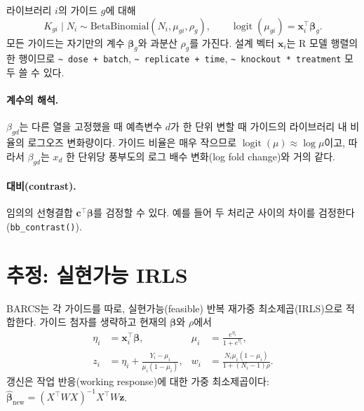 \documentclass[11pt]{article}
\newcommand{\logit}{\operatorname{logit}}
\begin{document}
라이브러리 $i$의 가이드 $g$에 대해
\begin{equation}
K_{gi}\mid N_i\sim\mathrm{BetaBinomial}(N_i,\mu_{gi},\rho_g),\qquad
\logit(\mu_{gi})=\mathbf{x}_i^\top\boldsymbol\beta_g .
\label{eq:model}
\end{equation}
모든 가이드는 자기만의 계수 $\boldsymbol\beta_g$와 과분산 $\rho_g$를 가진다.
설계 벡터 $\mathbf{x}_i$는 R 모델 행렬의 한 행이므로
\texttt{\textasciitilde{} dose + batch},
\texttt{\textasciitilde{} replicate + time},
\texttt{\textasciitilde{} knockout * treatment} 모두 쓸 수 있다.

\paragraph{계수의 해석.}
$\beta_{gd}$는 다른 열을 고정했을 때 예측변수 $d$가 한 단위 변할 때 가이드의
라이브러리 내 비율의 로그오즈 변화량이다. 가이드 비율은 매우 작으므로
$\logit(\mu)\approx\log\mu$이고, 따라서 $\beta_{gd}$는 $x_d$ 한 단위당
풍부도의 로그 배수 변화(log fold change)와 거의 같다.

\paragraph{대비(contrast).}
임의의 선형결합 $\mathbf{c}^\top\boldsymbol\beta$를 검정할 수 있다. 예를 들어
두 처리군 사이의 차이를 검정한다(\texttt{bb\_contrast()}).

\section{추정: 실현가능 IRLS}

BARCS는 각 가이드를 따로, 실현가능(feasible) 반복 재가중 최소제곱(IRLS)으로
적합한다. 가이드 첨자를 생략하고 현재의 $\boldsymbol\beta$와 $\rho$에서
\begin{align}
\eta_i&=\mathbf{x}_i^\top\boldsymbol\beta, &
\mu_i&=\frac{e^{\eta_i}}{1+e^{\eta_i}},\\
z_i&=\eta_i+\frac{Y_i-\mu_i}{\mu_i(1-\mu_i)}, &
w_i&=\frac{N_i\mu_i(1-\mu_i)}{1+(N_i-1)\rho}.
\end{align}
갱신은 작업 반응(working response)에 대한 가중 최소제곱이다:
$\widehat{\boldsymbol\beta}_{\text{new}}=(X^\top WX)^{-1}X^\top W\mathbf{z}$.
\end{document}
